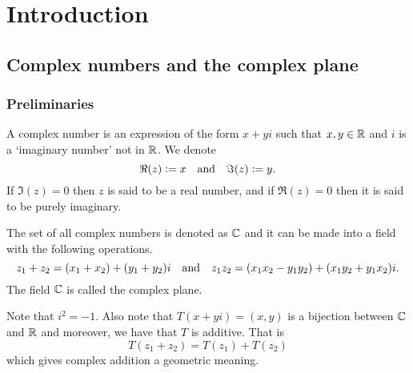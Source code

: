 \documentclass[11pt,a4paper]{article}
\begin{document}
\maketitle


\newpage
\tableofcontents
\newpage

\section{Introduction}

\subsection{Complex numbers and the complex plane}

\subsubsection{Preliminaries}

\begin{definition}
  A complex number is an expression of the form $x + yi$ such that
  $x,y \in \mathbb{R}$ and $i$ is a `imaginary number' not in $\mathbb{R}$.
  We denote
  \[
      \Re(z) := x \quad \text{and} \quad \Im(z) := y.
  \]
  If $\Im(z) = 0$ then $z$ is said to be a real number, and if
  $\Re(z) = 0$ then it is said to be purely imaginary.
\end{definition}

The set of all complex numbers is denoted as $\mathbb{C}$ and it can be made into
a field with the following operations.
\[
  z_1 + z_2 = (x_1 + x_2) + (y_1 + y_2) i \quad \text{and} \quad
  z_1 z_2 = (x_1 x_2 - y_1 y_2) + (x_1 y_2 + y_1 x_2) i.
\]
The field $\mathbb{C}$ is called the complex plane.

Note that $i^2 = -1$.
Also note that $T(x + y i) = (x, y)$ is a bijection between $\mathbb{C}$ and $\mathbb{R}$ and
moreover, we have that $T$ is additive.
That is
\[
  T(z_1 + z_2) = T(z_1) + T(z_2)
\]
which gives complex addition a geometric meaning.

\begin{center}
\end{center}
\end{document}
